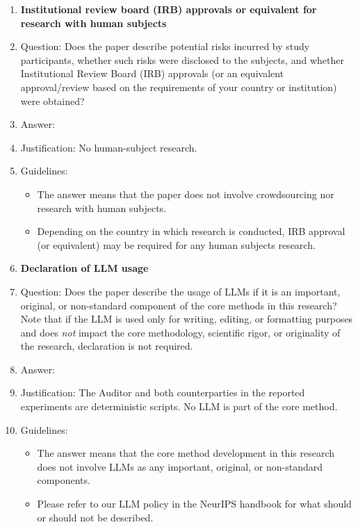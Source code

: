 \begin{enumerate}
\item {\bf Institutional review board (IRB) approvals or equivalent for research with human subjects}
    \item[] Question: Does the paper describe potential risks incurred by study participants, whether such risks were disclosed to the subjects, and whether Institutional Review Board (IRB) approvals (or an equivalent approval/review based on the requirements of your country or institution) were obtained?
    \item[] Answer: \answerNA{}
    \item[] Justification: No human-subject research.
    \item[] Guidelines:
    \begin{itemize}
        \item The answer \answerNA{} means that the paper does not involve crowdsourcing nor research with human subjects.
        \item Depending on the country in which research is conducted, IRB approval (or equivalent) may be required for any human subjects research.
    \end{itemize}

\item {\bf Declaration of LLM usage}
    \item[] Question: Does the paper describe the usage of LLMs if it is an important, original, or non-standard component of the core methods in this research? Note that if the LLM is used only for writing, editing, or formatting purposes and does \emph{not} impact the core methodology, scientific rigor, or originality of the research, declaration is not required.
    \item[] Answer: \answerNA{}
    \item[] Justification: The Auditor and both counterparties in the reported experiments are deterministic scripts. No LLM is part of the core method.
    \item[] Guidelines:
    \begin{itemize}
        \item The answer \answerNA{} means that the core method development in this research does not involve LLMs as any important, original, or non-standard components.
        \item Please refer to our LLM policy in the NeurIPS handbook for what should or should not be described.
    \end{itemize}

\end{enumerate}
